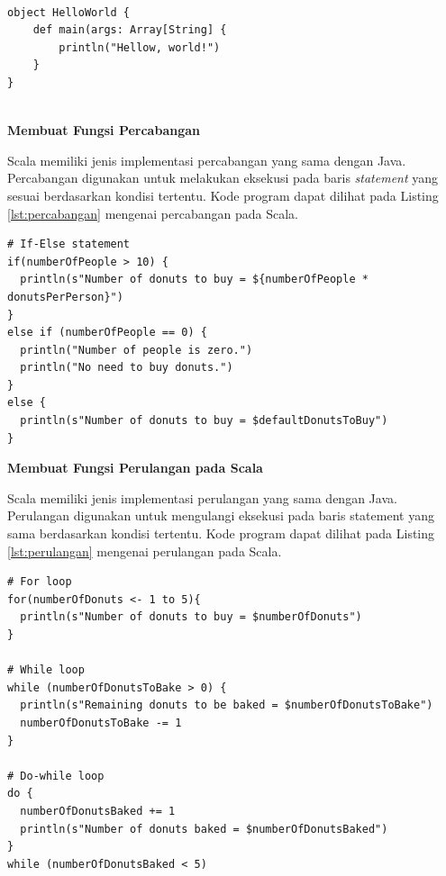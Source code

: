 \documentclass[a4paper,twoside]{article}
\begin{document}
\begin{enumerate}
\begin{lstlisting}[basicstyle=\ttfamily, frame=single,
	columns=fullflexible, keepspaces=true, breaklines=true, label=lst:main_method, caption=Membuat Main Method pada Scala]
	
object HelloWorld {
	def main(args: Array[String] {
		println("Hellow, world!")
	}
}
	
\end{lstlisting}

\textbf{Membuat Fungsi Percabangan}

Scala memiliki jenis implementasi percabangan yang sama dengan Java. Percabangan digunakan untuk melakukan eksekusi pada baris \textit{statement} yang sesuai berdasarkan kondisi tertentu. Kode program dapat dilihat pada Listing \ref{lst:percabangan} mengenai percabangan pada Scala.

\begin{lstlisting}[basicstyle=\ttfamily, frame=single,
	columns=fullflexible, keepspaces=true, breaklines=true, label=lst:percabangan, caption=Membuat Fungsi Percabangan pada Scala]
# If-Else statement
if(numberOfPeople > 10) { 
  println(s"Number of donuts to buy = ${numberOfPeople * donutsPerPerson}")
}
else if (numberOfPeople == 0) {
  println("Number of people is zero.")
  println("No need to buy donuts.")
} 
else {
  println(s"Number of donuts to buy = $defaultDonutsToBuy")
}
\end{lstlisting}

\textbf{Membuat Fungsi Perulangan pada Scala}

Scala memiliki jenis implementasi perulangan yang sama dengan Java. Perulangan digunakan untuk mengulangi eksekusi pada baris statement yang sama berdasarkan kondisi tertentu. Kode program dapat dilihat pada Listing \ref{lst:perulangan} mengenai perulangan pada Scala.

\begin{lstlisting}[basicstyle=\ttfamily, frame=single,
	columns=fullflexible, keepspaces=true, breaklines=true, label=lst:perulangan, caption=Membuat Fungsi Perulangan pada Scala]
# For loop
for(numberOfDonuts <- 1 to 5){
  println(s"Number of donuts to buy = $numberOfDonuts")
}

# While loop
while (numberOfDonutsToBake > 0) {
  println(s"Remaining donuts to be baked = $numberOfDonutsToBake")
  numberOfDonutsToBake -= 1
}

# Do-while loop
do {
  numberOfDonutsBaked += 1
  println(s"Number of donuts baked = $numberOfDonutsBaked")
} 
while (numberOfDonutsBaked < 5)
\end{lstlisting}
		

\end{enumerate}
\end{document}
